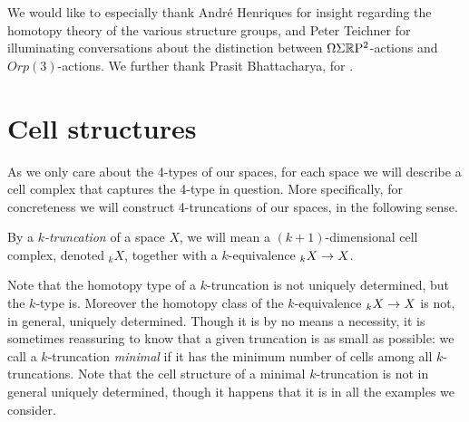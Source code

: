 \documentclass{amsart}
\begin{document}
We would like to especially thank Andr\'e Henriques for insight regarding the homotopy theory of the various structure groups, and Peter Teichner for illuminating conversations about the distinction between $\Omega \Sigma \mathbb R \mathrm{P}^2$-actions and $Orp(3)$-actions. We further thank Prasit Bhattacharya,  for .




\section{Cell structures}


As we only care about the 4-types of our spaces, for each space we will describe a cell complex that captures the 4-type in question.  More specifically, for concreteness we will construct 4-truncations of our spaces, in the following sense.

\begin{definition}[Truncation]
By a \emph{$k$-truncation} of a space $X$, we will mean a $(k+1)$-dimensional cell complex, denoted $_k X$, together with a $k$-equivalence $_{k} X \rightarrow X$.
\end{definition}
\nid Note that the homotopy type of a $k$-truncation is not uniquely determined, but the $k$-type is.  Moreover the homotopy class of the $k$-equivalence $_k X \rightarrow X$ is not, in general, uniquely determined.  Though it is by no means a necessity, it is sometimes reassuring to know that a given truncation is as small as possible: we call a $k$-truncation \emph{minimal} if it has the minimum number of cells among all $k$-truncations.  Note that the cell structure of a minimal $k$-truncation is not in general uniquely determined, though it happens that it is in all the examples we consider.

\end{document}
